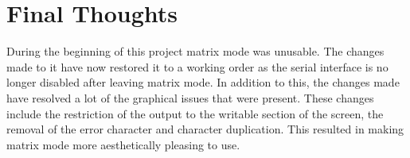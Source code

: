 \section{Final Thoughts}

During the beginning of this project matrix mode was unusable. The changes made to it have now restored it to a working order as the serial interface is no longer disabled after leaving matrix mode. In addition to this, the changes made have resolved a lot of the graphical issues that were present. These changes include the restriction of the output to the writable section of the screen, the removal of the error character and character duplication. This resulted in making matrix mode more aesthetically pleasing to use. 
